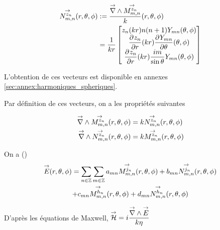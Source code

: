         \begin{align}
        \label{eq:defNnn}
          \Nmn[z_n](\rtp) &:= \frac{\vrot \Mmn[z_n]}{k}(\rtp) \\
          &= \frac{1}{kr}\begin{bmatrix}
            z_n(kr)n(n+1)Y_{mn}(\tp)
            \\
            \ddr{r}{z_n}(kr)\ddr{\theta}{Y_{mn}}(\tp)
            \\
            \ddr{r}{z_n}(kr)\frac{im}{\sin\theta}Y_{mn}(\tp)
          \end{bmatrix}
        \end{align}

        L'obtention de ces vecteurs est disponible en annexes \ref{sec:annex:harmoniques_spheriques}.

        Par définition de ces vecteurs, on a les propriétés suivantes
        \begin{prop}
            \label{prop:Mmn_Nmn_rot}
            \begin{align}
                \vrot \Mmn[z_n](\rtp) &= k\Nmn[z_n](\rtp)
                \\
                \vrot \Nmn[z_n](\rtp) &= k\Mmn[z_n](\rtp)
            \end{align}
        \end{prop}



        On a (\cite{cheng_spectral_1993})
        \begin{multline}
            \vE(\rtp) = \sum_{n\in\ZZ}\sum_{m\in\ZZ} a_{mn} \Mmn[j_n](\rtp) + b_{mn} \Nmn[j_n](\rtp)
            \\
            + c_{mn} \Mmn[h_n](\rtp) + d_{mn} \Nmn[h_n](\rtp)
        \end{multline}

        D'après les équations de Maxwell, \(\vH = i\frac{\vrot \vE}{k\eta}\)

